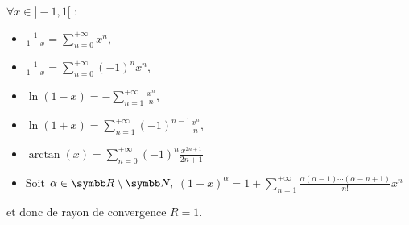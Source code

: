 \begin{proposition}{}{}
    $\forall x \in ]-1, 1[$ : 
    \begin{itemize}
        \item $\displaystyle \frac 1 {1 - x} = \sum_{n = 0}^{+\infty} x^n$,
        \item $\displaystyle \frac 1 { 1 + x} = \sum_{n = 0}^{+\infty} (-1)^n x^n$,
        \item $\displaystyle \ln(1 - x) = - \sum_{n = 1}^{+\infty} \frac{x^n}{n}$,
        \item $\displaystyle \ln(1 + x) = \sum_{n = 1}^{+\infty} (-1)^{n - 1} \frac{x^n}{n}$,
        \item $\displaystyle \arctan(x) = \sum_{n = 0}^{+\infty} (-1)^n \frac{x^{2n + 1}}{2n + 1}$
        \item Soit $\alpha \in \R \setminus \N, $
        $\displaystyle (1 + x)^\alpha =  1 + \sum_{n = 1}^{+\infty} \frac{\alpha (\alpha - 1) \cdots (\alpha - n + 1)}{n! } x^n$
    \end{itemize}
    et donc de rayon de convergence $R = 1$.
\end{proposition}

